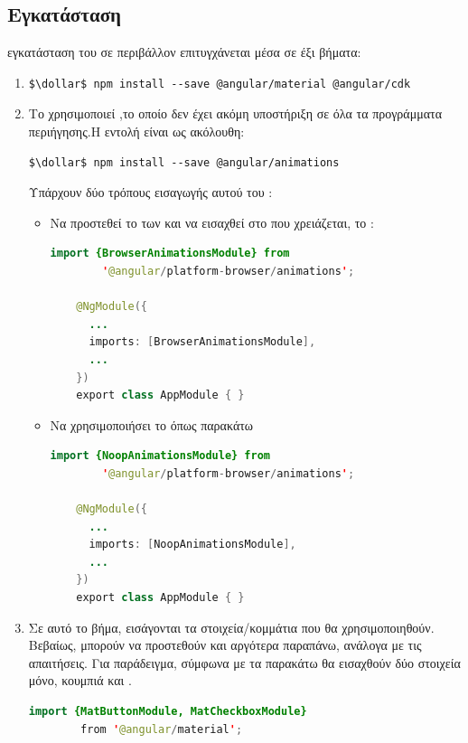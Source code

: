 \subsection*{Εγκατάσταση}
 εγκατάσταση του σε περιβάλλον  επιτυγχάνεται μέσα σε έξι βήματα:
\begin{enumerate}[label=\textbf{\arabic*}]
    \item 
{}
\begin{lstlisting}[language=command.com]
  $\dollar$ npm install --save @angular/material @angular/cdk
\end{lstlisting}
    \item Το  χρησιμοποιεί ,το οποίο δεν έχει ακόμη υποστήριξη σε όλα τα προγράμματα περιήγησης.Η εντολή  είναι ως ακόλουθη:   
\begin{lstlisting}[language=command.com]
  $\dollar$ npm install --save @angular/animations
\end{lstlisting}
Υπάρχουν δύο τρόπους εισαγωγής αυτού του :
    \begin{itemize}
        \item Να προστεθεί το  των  και να εισαχθεί στο  που χρειάζεται, το :
\begin{lstlisting}[language=Java]
    import {BrowserAnimationsModule} from 
        '@angular/platform-browser/animations';

    @NgModule({
      ...
      imports: [BrowserAnimationsModule],
      ...
    })
    export class AppModule { }
\end{lstlisting}
    \item  Να χρησιμοποιήσει το  όπως παρακάτω  
\begin{lstlisting}[language=Java]
    import {NoopAnimationsModule} from 
        '@angular/platform-browser/animations';

    @NgModule({
      ...
      imports: [NoopAnimationsModule],
      ...
    })
    export class AppModule { }
\end{lstlisting}
    \end{itemize}
    \item Σε αυτό το βήμα, εισάγονται τα στοιχεία/κομμάτια που θα χρησιμοποιηθούν.
    Βεβαίως, μπορούν να προστεθούν και αργότερα παραπάνω, ανάλογα με τις απαιτήσεις.
    Για παράδειγμα, σύμφωνα με τα παρακάτω θα εισαχθούν δύο στοιχεία μόνο, κουμπιά και .
\begin{lstlisting}[language=Java]
   import {MatButtonModule, MatCheckboxModule} 
        from '@angular/material';


\end{lstlisting}
\end{enumerate}
